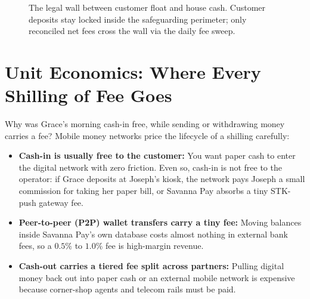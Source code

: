 \begin{figure}[htbp]
\caption{The legal wall between customer float and house cash. Customer deposits stay locked inside the safeguarding perimeter; only reconciled net fees cross the wall via the daily fee sweep.}
\label{fig:safeguarding-firewall}
\end{figure}

\section{Unit Economics: Where Every Shilling of Fee Goes}

Why was Grace's morning cash-in free, while sending or withdrawing money carries a fee? Mobile money networks price the lifecycle of a shilling carefully:
\begin{itemize}
  \item \textbf{Cash-in is usually free to the customer:} You want paper cash to enter the digital network with zero friction. Even so, cash-in is not free to the operator: if Grace deposits at Joseph's kiosk, the network pays Joseph a small commission for taking her paper bill, or Savanna Pay absorbs a tiny STK-push gateway fee.
  \item \textbf{Peer-to-peer (P2P) wallet transfers carry a tiny fee:} Moving balances inside Savanna Pay's own database costs almost nothing in external bank fees, so a $0.5\%$ to $1.0\%$ fee is high-margin revenue.
  \item \textbf{Cash-out carries a tiered fee split across partners:} Pulling digital money back out into paper cash or an external mobile network is expensive because corner-shop agents and telecom rails must be paid.
\end{itemize}

